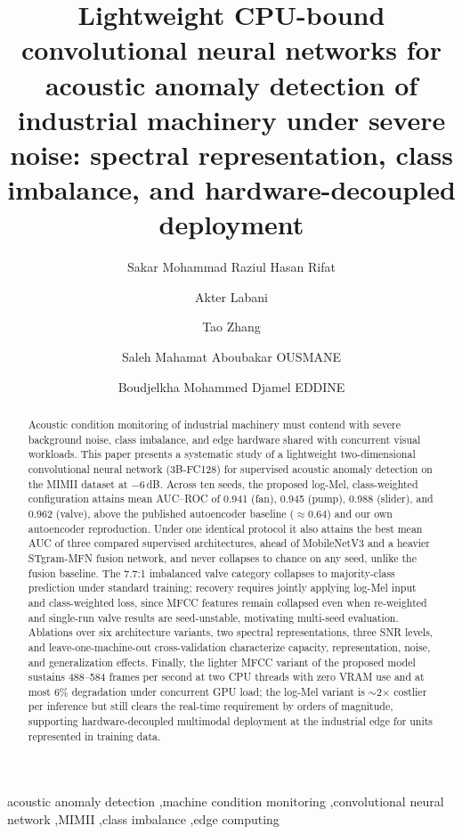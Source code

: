\documentclass[review,nopreprintline]{elsarticle}
\newcommand{\msFanAuc}{0.941}    \newcommand{\msFanAucSd}{0.009}    \newcommand{\msFanAucCI}{[0.934, 0.946]}
\newcommand{\msPumpAuc}{0.945}   \newcommand{\msPumpAucSd}{0.011}   \newcommand{\msPumpAucCI}{[0.938, 0.952]}
\newcommand{\msSliderAuc}{0.988} \newcommand{\msSliderAucSd}{0.006} \newcommand{\msSliderAucCI}{[0.985, 0.992]}
\newcommand{\msValveAuc}{0.962}  \newcommand{\msValveAucSd}{0.026}  \newcommand{\msValveAucCI}{[0.945, 0.976]}
\begin{document}
\linenumbers

\begin{frontmatter}

\title{Lightweight CPU-bound convolutional neural networks for acoustic anomaly detection of industrial machinery under severe noise: spectral representation, class imbalance, and hardware-decoupled deployment}

\author[HAU]{Sakar Mohammad Raziul Hasan Rifat}
\author[HAU]{Akter Labani}
\author[HAU]{Tao Zhang}
\author[HAU]{Saleh Mahamat Aboubakar OUSMANE}
\author[HAU]{Boudjelkha Mohammed Djamel EDDINE}


\begin{abstract}
Acoustic condition monitoring of industrial machinery must contend with severe background noise, class imbalance, and edge hardware shared with concurrent visual workloads. This paper presents a systematic study of a lightweight two-dimensional convolutional neural network (3B-FC128) for supervised acoustic anomaly detection on the MIMII dataset at $-6$\,dB. Across ten seeds, the proposed log-Mel, class-weighted configuration attains mean AUC--ROC of \msFanAuc{} (fan), \msPumpAuc{} (pump), \msSliderAuc{} (slider), and \msValveAuc{} (valve), above the published autoencoder baseline ($\approx 0.64$) and our own autoencoder reproduction. Under one identical protocol it also attains the best mean AUC of three compared supervised architectures, ahead of MobileNetV3 and a heavier STgram-MFN fusion network, and never collapses to chance on any seed, unlike the fusion baseline. The 7.7:1 imbalanced valve category collapses to majority-class prediction under standard training; recovery requires jointly applying log-Mel input and class-weighted loss, since MFCC features remain collapsed even when re-weighted and single-run valve results are seed-unstable, motivating multi-seed evaluation. Ablations over six architecture variants, two spectral representations, three SNR levels, and leave-one-machine-out cross-validation characterize capacity, representation, noise, and generalization effects. Finally, the lighter MFCC variant of the proposed model sustains 488--584 frames per second at two CPU threads with zero VRAM use and at most 6\% degradation under concurrent GPU load; the log-Mel variant is $\sim$2$\times$ costlier per inference but still clears the real-time requirement by orders of magnitude, supporting hardware-decoupled multimodal deployment at the industrial edge for units represented in training data.
\end{abstract}

\begin{keyword}
acoustic anomaly detection \sep machine condition monitoring \sep convolutional neural network \sep MIMII \sep class imbalance \sep edge computing
\end{keyword}

\end{frontmatter}
\end{document}
